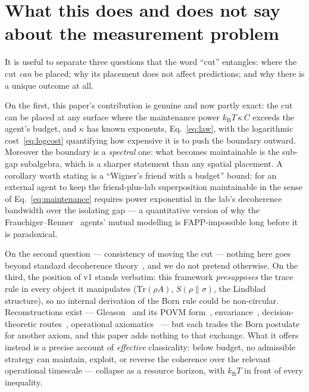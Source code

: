 \documentclass[11pt,a4paper]{article}
\theoremstyle{remark}
\newcommand{\Tr}{\mathrm{Tr}}
\newcommand{\kB}{k_{\mathrm{B}}}
\begin{document}
\section{What this does and does not say about the measurement problem}
\label{sec:foundations}

It is useful to separate three questions that the word ``cut'' entangles: where the cut
\emph{can} be placed; why its placement does not affect predictions; and why there is a
unique outcome at all.

On the first, this paper's contribution is genuine and now partly exact: the cut can be
placed at any surface where the maintenance power $\kB T\,\kappa\, C$ exceeds the agent's
budget, and $\kappa$ has known exponents, Eq.~\eqref{eq:law}, with the logarithmic
cost~\eqref{eq:logcost} quantifying how expensive it is to push the boundary outward.
Moreover the boundary is a \emph{spectral} one: what becomes maintainable is the sub-gap
subalgebra, which is a sharper statement than any spatial placement. A corollary worth
stating is a ``Wigner's friend with a budget'' bound: for an external agent to keep the
friend-plus-lab superposition maintainable in the sense of
Eq.~\eqref{eq:maintenance} requires power exponential in the lab's decoherence
bandwidth over the isolating gap --- a quantitative version of why the
Frauchiger--Renner~\cite{FrauchigerRenner2018} agents' mutual modelling is FAPP-impossible
long before it is paradoxical.

On the second question --- consistency of moving the cut --- nothing here goes beyond
standard decoherence theory~\cite{Zurek2003RMP,Schlosshauer2004}, and we do not pretend
otherwise. On the third, the position of v1 stands verbatim: this framework
\emph{presupposes} the trace rule in every object it manipulates ($\Tr(\rho A)$,
$S(\rho\|\sigma)$, the Lindblad structure), so no internal derivation of the Born rule
could be non-circular. Reconstructions exist --- Gleason~\cite{Gleason1957} and its POVM
form~\cite{Busch2003}, envariance~\cite{ZurekEnvariance2003}, decision-theoretic
routes~\cite{Deutsch1999,Wallace2012}, operational
axiomatics~\cite{Masanes2019} --- but each trades the Born postulate for another axiom,
and this paper adds nothing to that exchange. What it offers instead is a precise account
of \emph{effective} classicality: below budget, no admissible strategy can maintain,
exploit, or reverse the coherence over the relevant operational timescale --- collapse as
a resource horizon, with $\kB T$ in front of every inequality.
\end{document}
